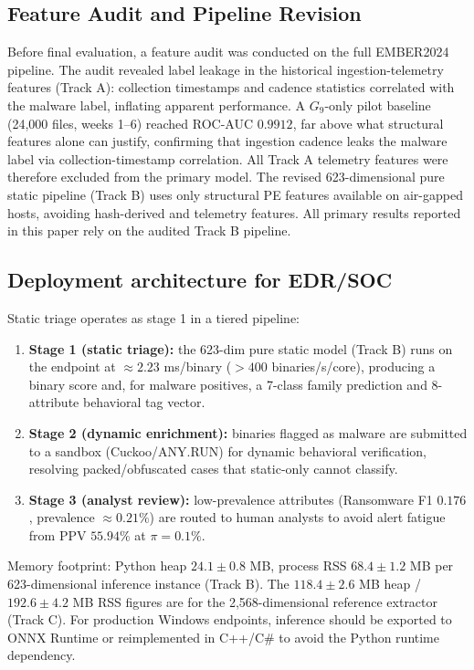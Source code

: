 \documentclass[Number]{sn-jnl}
\begin{document}
\subsection*{Feature Audit and Pipeline Revision}
Before final evaluation, a feature audit was conducted on the full EMBER2024 pipeline. The audit revealed label leakage in the historical ingestion-telemetry features (Track A): collection timestamps and cadence statistics correlated with the malware label, inflating apparent performance. A $G_9$-only pilot baseline (24,000 files, weeks 1--6) reached ROC-AUC $0.9912$, far above what structural features alone can justify, confirming that ingestion cadence leaks the malware label via collection-timestamp correlation. All Track A telemetry features were therefore excluded from the primary model. The revised 623-dimensional pure static pipeline (Track B) uses only structural PE features available on air-gapped hosts, avoiding hash-derived and telemetry features. All primary results reported in this paper rely on the audited Track B pipeline.

\subsection*{Deployment architecture for EDR/SOC}
Static triage operates as stage 1 in a tiered pipeline:
\begin{enumerate}[leftmargin=*]
\item \textbf{Stage 1 (static triage):} the 623-dim pure static model (Track B) runs on the endpoint at $\approx2.23$ ms/binary ($>400$ binaries/s/core), producing a binary score and, for malware positives, a 7-class family prediction and 8-attribute behavioral tag vector.
\item \textbf{Stage 2 (dynamic enrichment):} binaries flagged as malware are submitted to a sandbox (Cuckoo/ANY.RUN) for dynamic behavioral verification, resolving packed/obfuscated cases that static-only cannot classify.
\item \textbf{Stage 3 (analyst review):} low-prevalence attributes (Ransomware F1 $0.176$, prevalence $\approx0.21\%$) are routed to human analysts to avoid alert fatigue from PPV $55.94\%$ at $\pi=0.1\%$.
\end{enumerate}
Memory footprint: Python heap $24.1\pm0.8$ MB, process RSS $68.4\pm1.2$ MB per 623-dimensional inference instance (Track B). The $118.4\pm2.6$ MB heap / $192.6\pm4.2$ MB RSS figures are for the 2,568-dimensional reference extractor (Track C). For production Windows endpoints, inference should be exported to ONNX Runtime or reimplemented in C++/C\# to avoid the Python runtime dependency.
\end{document}
